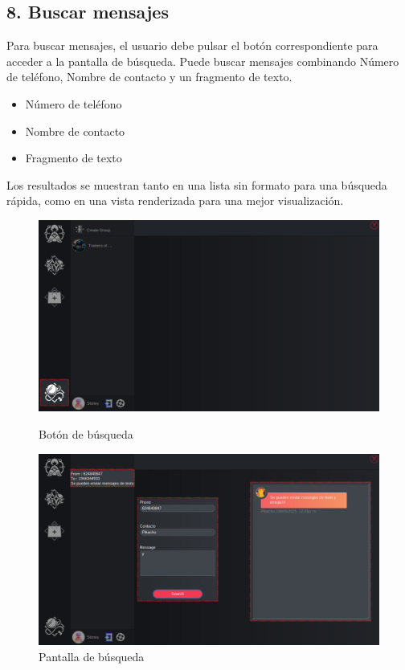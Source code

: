 \subsection*{8. Buscar mensajes}
Para buscar mensajes, el usuario debe pulsar el botón correspondiente para acceder a la pantalla de búsqueda.  
Puede buscar mensajes combinando Número de teléfono, Nombre de contacto y un fragmento de texto.

\begin{itemize}
    \item Número de teléfono
    \item Nombre de contacto
    \item Fragmento de texto
\end{itemize}

Los resultados se muestran tanto en una lista sin formato para una búsqueda rápida, como en una vista renderizada para una mejor visualización.

\begin{figure}[H]
    \centering
    \begin{minipage}[b]{0.48\textwidth}
        \centering
        \includegraphics[width=\textwidth]{images/manualDeUsuario/BuscarMensajes1.png}
        \caption*{Botón de búsqueda}
    \end{minipage}
    \hfill
    \begin{minipage}[b]{0.48\textwidth}
        \centering
        \includegraphics[width=\textwidth]{images/manualDeUsuario/BuscarMensajes2.png}
        \caption*{Pantalla de búsqueda}
    \end{minipage}
\end{figure}

